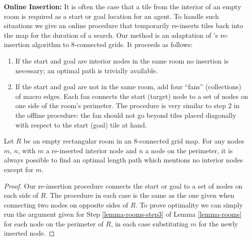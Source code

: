 \noindent
\textbf{Online Insertion:}
It is often the case that a tile from the interior of an empty room is required as a start or goal location for an
agent. 
To handle such situations we give an online procedure that temporarily re-inserts tiles back into the map for the duration
of a search. 
Our method is an adaptation of \citeauthor{harabor10}'s re-insertion algorithm to 8-connected grids.
It proceeds as follows:

\begin{enumerate}
\item{If the start and goal are interior nodes in the same room no insertion is necessary; an optimal
path is trivially available. }
\item{If the start and goal are not in the same room, add four ``fans'' (collections) of macro edges.
Each fan connects the start (target) node to a set of nodes on one side of the room's perimeter.
The procedure is very similar to step 2 in the offline procedure: the fan should not go beyond tiles
placed diagonally with respect to the start (goal) tile at hand.}
\end{enumerate}
\begin{lemma}
\label{lemma-insertion}
Let $R$ be an empty rectangular room in an 8-connected grid map.
For any nodes $m$, $n$, with $m$ a re-inserted interior node and $n$ a node on the perimeter, it is always possible to
find an optimal length path which mentions no interior nodes except for $m$.
\end{lemma}
\begin{proof}
Our re-insertion procedure connects the start or goal to a set of nodes on each side of $R$.
The procedure in each case is the same as the one given when connecting two nodes on opposite sides of $R$.
To prove optimality we can simply run the argument given for Step \ref{lemma-rooms-step3} of Lemma \ref{lemma-rooms} for each
node on the perimeter of $R$, in each case substituting $m$ for the newly inserted node.
\end{proof}

